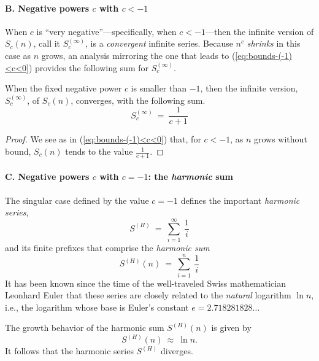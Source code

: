 \paragraph{\sf B. Negative powers $c$ with $c < -1$}
When $c$ is ``very negative''---specifically, when $c < -1$---then the
infinite version of $S_c(n)$, call it $S_c^{(\infty)}$, is a {\em
  convergent} infinite series.  Because $n^c$ {\em shrinks} in this
case as $n$ grows, an analysis mirroring the one that leads to
(\ref{eq:bounds-(-1)<c<0}) provides the following sum for $S_c^{(\infty)}$.

\begin{prop}
\label{thm:bounds-negative-(not-1)-sum-xc}
When the fixed negative power $c$ is smaller than $-1$, then the
infinite version, $S_c^{(\infty)}$, of $S_c(n)$, converges, with the
following sum.
\begin{equation}
\label{eq:bounds-negative-(not-1)-sum-xc}
S_c^{(\infty)} \ = \ \frac{1}{c+1}
\end{equation}
\end{prop}

\begin{proof}
We see as in (\ref{eq:bounds-(-1)<c<0}) that, for $c<-1$, as $n$ grows
without bound, $S_c(n)$ tends to the value ${\displaystyle
  \frac{1}{c+1}}$.
\end{proof}

\paragraph{\sf C. Negative powers $c$ with $c = -1$: the {\em harmonic} sum}
The singular case defined by the value $c = -1$ defines the important
{\it harmonic series},
\[ S^{(H)} \ = \ \sum_{i=1}^\infty \ \frac{1}{i} \]
and its finite prefixes that comprise the {\it harmonic sum}
\[ S^{(H)}(n) \ = \ \sum_{i=1}^n \ \frac{1}{i} \]
It has been known since the time of the well-traveled Swiss
mathematician Leonhard Euler  that these series
are closely related to the {\em natural} logarithm $\ln n$, i.e., the
logarithm whose base is Euler's constant
$e = 2.718281828 \ldots$

\begin{prop}
\label{thm:harmonic}
The growth behavior of the harmonic sum $S^{(H)}(n)$ is given by
\[ S^{(H)}(n) \ \approx \ \ln n. \]
It follows that the harmonic series $S^{(H)}$ diverges.
\end{prop}

